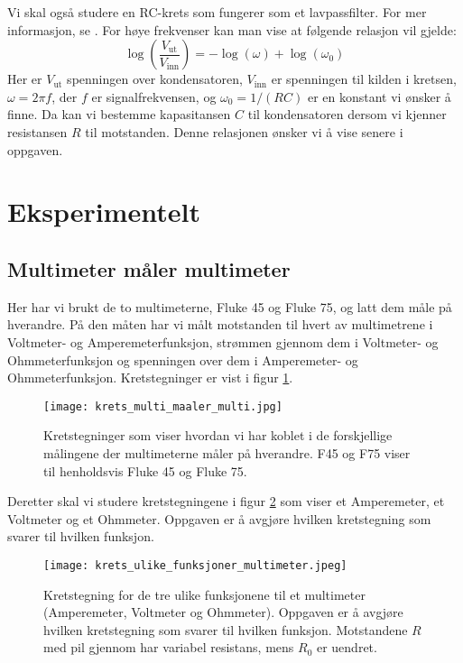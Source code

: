 \documentclass[reprint, english,notitlepage]{revtex4-1}  %
\begin{document}
Vi skal også studere en RC-krets som fungerer som et lavpassfilter. For mer informasjon, se \citep{oppgave}. For høye frekvenser kan man vise at følgende relasjon vil gjelde:
\begin{equation*}
  \log \left( \frac{V_{\text{ut}}}{V_{\text{inn}}} \right) = -\log (\omega) + \log (\omega_0)
\end{equation*}
Her er $V_{\text{ut}}$ spenningen over kondensatoren, $V_{\text{inn}}$ er spenningen til kilden i kretsen, $\omega = 2 \pi f$, der $f$ er signalfrekvensen, og $\omega_0 = 1/(R C)$ er en konstant vi ønsker å finne. Da kan vi bestemme kapasitansen $C$ til kondensatoren dersom vi kjenner resistansen $R$ til motstanden. Denne relasjonen ønsker vi å vise senere i oppgaven.


\section{Eksperimentelt}

\subsection{Multimeter måler multimeter}
Her har vi brukt de to multimeterne, Fluke 45 og Fluke 75, og latt dem måle på hverandre. På den måten har vi målt motstanden til hvert av multimetrene i Voltmeter- og Amperemeterfunksjon, strømmen gjennom dem i Voltmeter- og Ohmmeterfunksjon og spenningen over dem i Amperemeter- og Ohmmeterfunksjon. Kretstegninger er vist i figur \ref{fig:krets_multi_maaler_multi}.
\begin{figure}
  \texttt{[image: krets\_multi\_maaler\_multi.jpg]}
  \caption{Kretstegninger som viser hvordan vi har koblet i de forskjellige målingene der multimeterne måler på hverandre. F45 og F75 viser til henholdsvis Fluke 45 og Fluke 75.}
  \label{fig:krets_multi_maaler_multi}
\end{figure}

Deretter skal vi studere kretstegningene i figur \ref{fig:krets_ulike_funksjoner_multimeter} som viser et Amperemeter, et Voltmeter og et Ohmmeter. Oppgaven er å avgjøre hvilken kretstegning som svarer til hvilken funksjon.
\begin{figure}
  \texttt{[image: krets\_ulike\_funksjoner\_multimeter.jpeg]}
  \caption{Kretstegning for de tre ulike funksjonene til et multimeter (Amperemeter, Voltmeter og Ohmmeter). Oppgaven er å avgjøre hvilken kretstegning som svarer til hvilken funksjon. Motstandene $R$ med pil gjennom har variabel resistans, mens $R_0$ er uendret.}
  \label{fig:krets_ulike_funksjoner_multimeter}
\end{figure}
\end{document}
